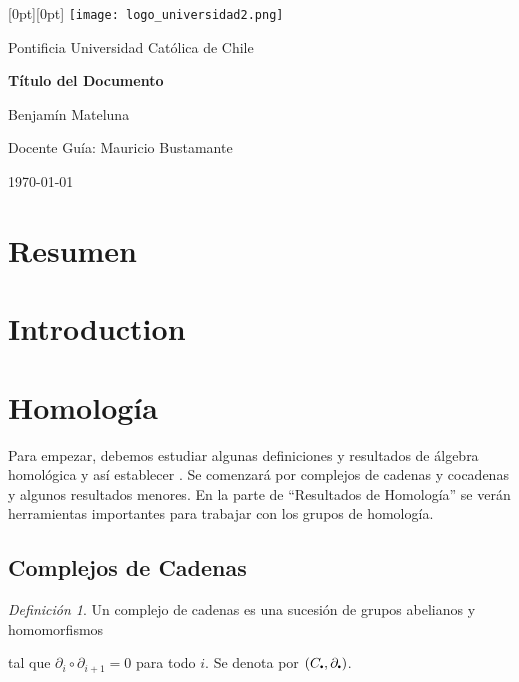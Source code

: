\documentclass[aop]{imsart2}
\theoremstyle{plain}
\theoremstyle{remark}
\newtheorem{dfn}[teo]{Definición}
\newcommand\sbullet[1][.5]{\mathbin{\vcenter{\hbox{\scalebox{#1}{$\bullet$}}}}}
\begin{document}
\begin{titlepage}
    \hspace*{-3cm}
    \raisebox{-1cm}[0pt][0pt]{
        \texttt{[image: logo\_universidad2.png]}
    }

    \vspace{2cm}
    \begin{center}
        {\Large Pontificia Universidad Católica de Chile}
        
        \vspace{2cm}
        {\Huge \bfseries Título del Documento}
        
        \vspace{1.5cm}
        {\Large Benjamín Mateluna}
        
        \vspace{1.5cm}
        {\Large Docente Guía: Mauricio Bustamante}
        \vfill
        
        {\large \today \par}
    \end{center}
\end{titlepage}

\tableofcontents

\newpage
\section{Resumen}

\section{Introduction}

\newpage
\section{Homología}
Para empezar, debemos estudiar algunas definiciones y resultados de álgebra homológica y así 
establecer . Se comenzará por complejos de cadenas y cocadenas y algunos resultados menores. En la 
parte de ``Resultados de Homología'' se verán herramientas importantes para trabajar con los 
grupos de homología.

\subsection{Complejos de Cadenas}

\begin{dfn}
    Un complejo de cadenas es una sucesión de grupos abelianos y homomorfismos
    
    \vspace{2mm}
    \centerline{
    }
    \vspace{2mm}
    \noindent tal que $\partial_{i}\circ \partial_{i+1}=0$ para todo $i$. Se denota por 
    $(C_{\sbullet},\partial_{\sbullet})$.
\end{dfn}
\end{document}
